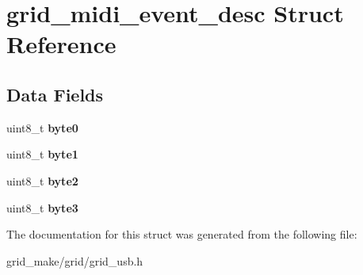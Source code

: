 \hypertarget{structgrid__midi__event__desc}{\section{grid\-\_\-midi\-\_\-event\-\_\-desc Struct Reference}
\label{structgrid__midi__event__desc}
}
\subsection*{Data Fields}
\begin{DoxyCompactItemize}
\item 
\hypertarget{structgrid__midi__event__desc_a1f90f33ddabe722f33d91795a3e21b60}{uint8\-\_\-t {\bfseries byte0}}\label{structgrid__midi__event__desc_a1f90f33ddabe722f33d91795a3e21b60}

\item 
\hypertarget{structgrid__midi__event__desc_ad744898b39b5b12afac81cbebffe0ca5}{uint8\-\_\-t {\bfseries byte1}}\label{structgrid__midi__event__desc_ad744898b39b5b12afac81cbebffe0ca5}

\item 
\hypertarget{structgrid__midi__event__desc_a370542e92e2b57d3404e4db9b0d75751}{uint8\-\_\-t {\bfseries byte2}}\label{structgrid__midi__event__desc_a370542e92e2b57d3404e4db9b0d75751}

\item 
\hypertarget{structgrid__midi__event__desc_ab34a22d5320f722d4f1a230b57e9548a}{uint8\-\_\-t {\bfseries byte3}}\label{structgrid__midi__event__desc_ab34a22d5320f722d4f1a230b57e9548a}

\end{DoxyCompactItemize}


The documentation for this struct was generated from the following file\-:\begin{DoxyCompactItemize}
\item 
grid\-\_\-make/grid/grid\-\_\-usb.\-h\end{DoxyCompactItemize}
